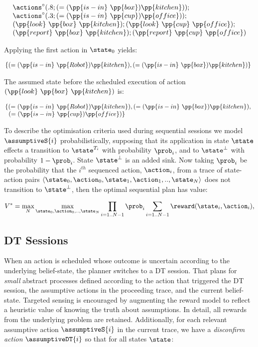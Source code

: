 \small
\[
\begin{array}{l}
\actions^{\circ}(.8;(=(\pp{is-in}~\pp{box})\pp{kitchen}));\\
\actions^{\circ}(.3;(=(\pp{is-in}~\pp{cup})\pp{office}));\\
(\pp{look}~\pp{box}~\pp{kitchen});
(\pp{look}~\pp{cup}~\pp{office});\\
(\pp{report}~\pp{box}~\pp{kitchen}); 
(\pp{report}~\pp{cup}~\pp{office})
\end{array}
\]
\normalsize

\noindent Applying the first action in $\state_0$ yields:


\small
\[
\hspace{-1ex}\begin{array}{l}
\{(=(\pp{is-in}~\pp{Robot})\pp{kitchen}),(=(\pp{is-in}~\pp{box})\pp{kitchen})\}
\end{array}
\]
\normalsize

\noindent The assumed state before the scheduled execution of
action $(\pp{look}~\pp{box}~\pp{kitchen})$ is:

\small
\[
\hspace{-1ex}\begin{array}{l}
\{(=(\pp{is-in}~\pp{Robot})\pp{kitchen}),
(=(\pp{is-in}~\pp{box})\pp{kitchen}), \\\;\;(=(\pp{is-in}~\pp{cup})\pp{office})\}
\end{array}
 \]
\normalsize

To describe the optimisation criteria used during sequential sessions
we model $\assumptiveS{i}$ probabilistically, supposing that its
application in state $\state$ effects a transition to $\state^{T_i}$
with probability $\prob_i$, and to $\state^\bot$ with probability $1 -
\prob_i$. State $\state^\bot$ is an added sink. Now taking $\prob_i$
be the probability that the $i^{th}$ sequenced action, $\action_i$,
from a trace of state-action pairs $\langle \state_0,
\action_0,\state_1, \action_1,.., \state_N \rangle$ does not
transition to $\state^\bot$, then the optimal sequential plan has
value:

\small
\[
V^* = \max_N \max_{\state_0, \action_0,.., \state_N} \prod_{i=1..N-1} \prob_i \sum_{i=1..N-1}
\reward(\state_i, \action_i),
\]
\normalsize

\subsection{DT Sessions}

When an action is scheduled whose outcome is uncertain according to
the underlying belief-state, the planner switches to a DT
session. That plans for {\em small} abstract processes defined
according to the action that triggered the DT session, the assumptive
actions in the proceeding trace, and the current
belief-state. Targeted sensing is encouraged by augmenting the reward
model to reflect a heuristic value of knowing the truth about
assumptions. In detail, all rewards from the underlying problem are
retained. Additionally, for each relevant assumptive action
$\assumptiveS{i}$ in the current trace, we have a {\em disconfirm
action} $\assumptiveDT{i}$ so that for all states $\state$:

